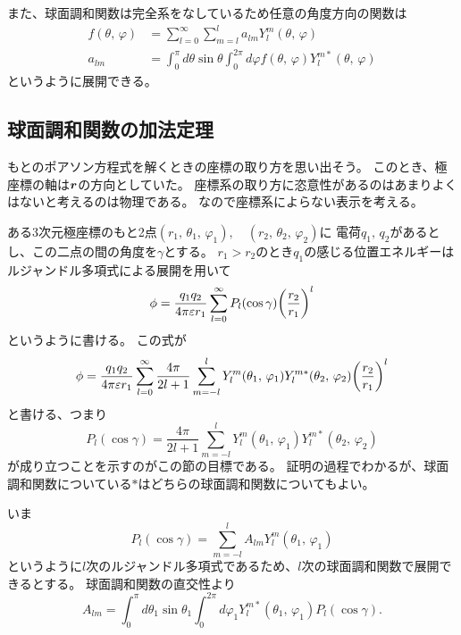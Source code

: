 \documentclass[../../master.tex]{subfiles}
\begin{document}
また、球面調和関数は完全系をなしているため任意の角度方向の関数は
\begin{align}
	f(\theta,\,\varphi) &= \sum_{l=0}^{\infty}\sum_{m=l}^{l} a_{lm}Y_l^m(\theta,\,\varphi)\\
	a_{lm} &=\int_{0}^{\pi} d\theta\sin\theta\int_{0}^{2\pi}d\varphi f(\theta,\,\varphi)Y_l^{m*}(\theta,\,\varphi)
\end{align}
というように展開できる。

\subsection{球面調和関数の加法定理}
もとのポアソン方程式を解くときの座標の取り方を思い出そう。
このとき、極座標の軸は\(\vb*{r}\)の方向としていた。
座標系の取り方に恣意性があるのはあまりよくはないと考えるのは物理である。
なので座標系によらない表示を考える。

ある3次元極座標のもと2点\((r_1,\,\theta_1,\,\varphi_1),\quad (r_2,\,\theta_2,\,\varphi_2)\)に
電荷\(q_1,\,q_2\)があるとし、この二点の間の角度を\(\gamma\)とする。
\(r_1>r_2\)のとき\(q_1\)の感じる位置エネルギーはルジャンドル多項式による展開を用いて
\begin{equation}
	\phi = \frac{q_1 q_2}{4\pi\varepsilon r_1} \sum_{l=0}^{\infty}P_l(\cos\gamma)\qty(\frac{r_2}{r_1})^l
\end{equation}
というように書ける。
この式が
\begin{equation}
	\phi = \frac{q_1 q_2}{4\pi\varepsilon r_1}
	\sum_{l=0}^{\infty}\frac{4\pi}{2l+1}\sum_{m=-l}^{l} Y_l^m(\theta_1,\,\varphi_1) Y_l^{m*}(\theta_2,\,\varphi_2)\qty(\frac{r_2}{r_1})^l
\end{equation}
と書ける、つまり
\begin{equation}
	P_l(\cos\gamma) = \frac{4\pi}{2l+1}\sum_{m=-l}^{l} Y_l^m(\theta_1,\,\varphi_1) Y_l^{m*}(\theta_2,\,\varphi_2)
\end{equation}
が成り立つことを示すのがこの節の目標である。
証明の過程でわかるが、球面調和関数についている\(*\)はどちらの球面調和関数についてもよい。

いま
\begin{equation}
	P_l(\cos\gamma) = \sum_{m=-l}^{l} A_{lm}Y_l^m(\theta_1,\,\varphi_1)
\end{equation}
というように\(l\)次のルジャンドル多項式であるため、\(l\)次の球面調和関数で展開できるとする。%
球面調和関数の直交性より
\begin{equation}
	A_{lm} = \int_{0}^{\pi} d\theta_1 \sin\theta_1 \int_{0}^{2\pi} d\varphi_1 Y_l^{m*}(\theta_1,\,\varphi_1) P_l(\cos\gamma).
\end{equation}
\end{document}
